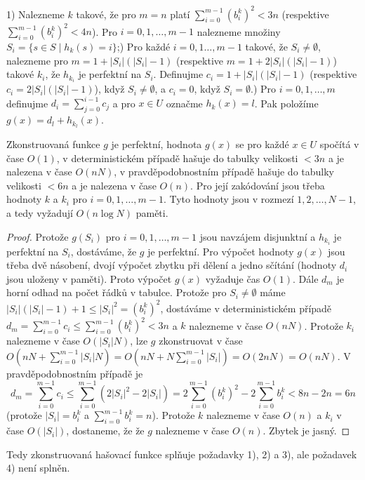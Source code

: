 \documentclass[a4paper,12pt]{article}
\begin{document}
1) Nalezneme $k$ takové, že pro $m=n$ platí 
$\sum_{i=0}^{m-1}(b_i^k)^2<3n$ (respektive $\sum_{i=0}^{m-1}(b_i^
k)^2<4n$).  Pro 
$i=0,1,\dots,m-1$ nalezneme množiny 
$S_i=\{s\in S\mid h_k(s)=i\}$;) Pro každé $i=0,1\dots,m-1$ takové, že $S_i\ne\emptyset$, 
nalezneme pro $m=1+|S_i|(|S_i|-1)$ (respektive $m=1+2|S_i|(|S_i|-
1)$) 
takové $k_i$, že $h_{k_i}$ je perfektní na $S_i$. Definujme 
$c_i=1+|S_i|(|S_i|-1)$ (respektive $c_i=2|S_i|(|S_i|-1)$), když 
$S_i\ne\emptyset$, a $c_i=0$, když 
$S_i=\emptyset$.) Pro $i=0,1,\dots,m$ definujme $d_i=\sum_{j=0}^{i-1}c_j$ a pro $
x\in U$ 
označme $h_k(x)=l$. Pak položíme $g(x)=d_l+h_{k_l}(x)$.

\begin{veta}Zkonstruovaná funkce $g$ je perfektní, 
hodnota $g(x)$ se pro každé $x\in U$ spočítá v čase $
O(1)$, 
v deterministickém přípa\-dě hašuje do tabulky velikosti 
$<3n$ a je nalezena v čase $O(nN)$, v pravděpodobnostním 
přípa\-dě hašuje do tabulky velikosti $<6n$ a je nalezena 
v čase $O(n)$. Pro její zak\'odování jsou třeba hodnoty $
k$ a 
$k_i$ pro $i=0,1,\dots,m-1$. Tyto hodnoty jsou v rozmezí 
$1,2,\dots,N-1$, a tedy vyžadují $O(n\log N)$ paměti.
\end{veta}

\begin{proof}Protože $g(S_i)$ pro $i=0,1,\dots,m-1$ 
jsou navzájem disjunktní a $h_{k_i}$ je perfektní na $S_
i$, 
dostáváme, že $g$ je perfektní. Pro výpočet hodnoty $
g(x)$ 
jsou třeba dvě násobení, dvojí výpočet zbytku při 
dělení a jedno sčítání (hodnoty $d_i$ jsou uloženy v 
paměti). Proto výpočet $g(x)$ vyžaduje čas $O(1)$. Dále 
$d_m$ je horní odhad na počet řádků v tabulce. 
Protože pro $S_i\ne\emptyset$ máme $|S_i|(|S_i|-1)+1\le |S_
i|^2=(b_i^k)^2$, 
dostáváme v deterministickém případě 
$d_m=\sum_{i=0}^{m-1}c_i\le\sum_{i=0}^{m-1}(b_i^k)^2<3n$ a $k$ nalezneme v čase 
$O(nN)$. Protože $k_i$ nalezneme v čase $O(|S_i|N)$, lze $g$ 
zkonstruovat v čase 
$O(nN+\sum_{i=0}^{m-1}|S_i|N)=O(nN+N\sum_{i=0}^{m-1}|S_i|)=O(2nN)
=O(nN)$. 
V pravděpodob\-nostním případě je 
$$d_m=\sum_{i=0}^{m-1}c_i\le\sum_{i=0}^{m-1}(2|S_i|^2-2|S_i|)=2\sum_{
i=0}^{m-1}(b_i^k)^2-2\sum_{i=0}^{m-1}b_i^k<8n-2n=6n$$
(protože $|S_i|=b_i^k$ a $\sum_{i=0}^{m-1}b_i^k=n$). Protože $
k$ nalezneme v čase $O(n)$ a $k_i$ v čase $O(|S_i|)$, dostaneme, že 
že $g$ nalezneme v čase $O(n)$. Zbytek je jasný.
\end{proof}

Tedy zkonstruovaná hašovací funkce splňuje požadavky 
1), 2) a 3), ale požadavek 4) není splněn. 
\end{document}
